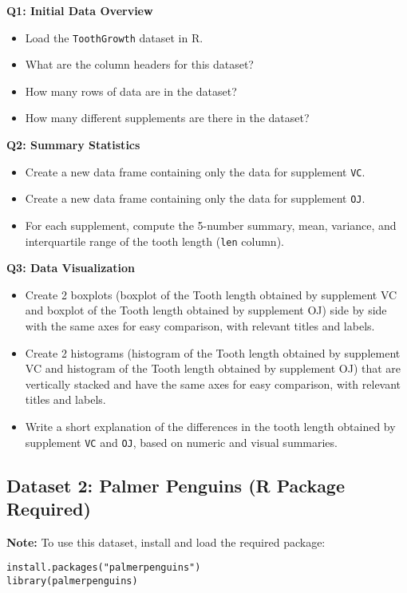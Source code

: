 \documentclass{article}
\begin{document}
\textbf{Q1: Initial Data Overview}
\begin{itemize}
    \item Load the \texttt{ToothGrowth} dataset in R.
    \item What are the column headers for this dataset?
    \item How many rows of data are in the dataset?
    \item How many different supplements are there in the dataset?
\end{itemize}

\textbf{Q2: Summary Statistics}
\begin{itemize}
    \item Create a new data frame containing only the data for supplement \texttt{VC}.
    \item Create a new data frame containing only the data for supplement \texttt{OJ}.
    \item For each supplement, compute the 5-number summary, mean, variance, and interquartile range of the tooth length (\texttt{len} column).
\end{itemize}

\textbf{Q3: Data Visualization}
\begin{itemize}
    \item Create 2 boxplots (boxplot of the Tooth length obtained by supplement VC and 	boxplot of the Tooth length obtained by supplement OJ) side by side with the same axes for easy comparison, with relevant titles and labels.
    \item Create 2 histograms (histogram of the Tooth length obtained by supplement VC and 	histogram of the Tooth length obtained by supplement OJ) that are vertically stacked and have the same axes for easy comparison, with relevant titles and labels.
    \item Write a short explanation of the differences in the tooth length obtained by supplement \texttt{VC} and \texttt{OJ}, based on numeric and visual summaries.
\end{itemize}

\subsection{Dataset 2: Palmer Penguins (R Package Required)}
\textbf{Note:} To use this dataset, install and load the required package:
\begin{lstlisting}
install.packages("palmerpenguins")
library(palmerpenguins)
\end{lstlisting}
\end{document}
